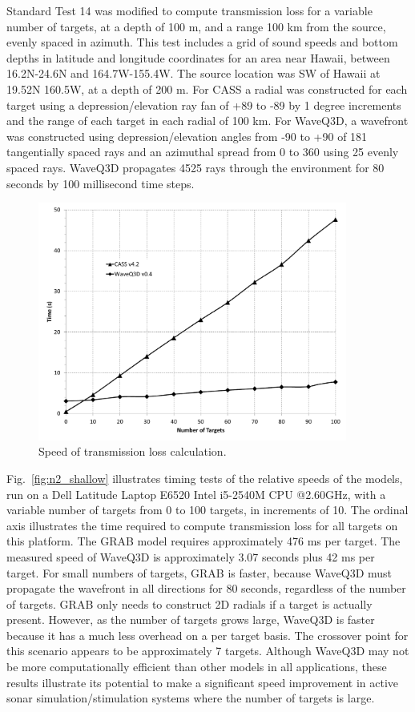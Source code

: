 \documentclass{ws-jca}
\newcommand{\twoD}{2\nobreakdash\textendash D }	%
\begin{document}
Standard Test 14 was modified to compute transmission loss for a variable number of targets, at a depth of 100 m, and a range 100 km from the source, evenly spaced in azimuth. This test includes a grid of sound speeds and bottom depths in latitude and longitude coordinates for an area near Hawaii, between 16.2N-24.6N and 164.7W-155.4W. The source location was SW of Hawaii at 19.52N 160.5W, at a depth of 200 m.  For CASS a radial was constructed for each target using a depression/elevation ray fan of +89 to -89 by 1 degree increments and the range of each target in each radial of 100 km. For WaveQ3D, a wavefront was constructed using depression/elevation angles from -90 to +90 of 181 tangentially spaced rays and an azimuthal spread from 0 to 360 using 25 evenly spaced rays. WaveQ3D propagates 4525 rays through the environment for 80 seconds by 100 millisecond time steps. 

\begin{figure}[th]
	\centerline{\includegraphics[width=4in]{std14_timing_test.pdf}} 
	\vspace*{8pt}
	\caption{Speed of transmission loss calculation. \label{fig:std14_timing_test}}
\end{figure}

Fig.~\ref{fig:n2_shallow} illustrates timing tests of the relative speeds of the models, run on a Dell Latitude Laptop E6520 Intel i5-2540M CPU @2.60GHz, with a variable number of targets from 0 to 100 targets, in increments of 10. The ordinal axis illustrates the time required to compute transmission loss for all targets on this platform.  The GRAB model requires approximately 476 ms per target.  The measured speed of WaveQ3D is approximately 3.07 seconds plus 42 ms per target.  For small numbers of targets, GRAB is faster, because WaveQ3D must propagate the wavefront in all directions for 80 seconds, regardless of the number of targets.  GRAB only needs to construct \twoD radials if a target is actually present.  However, as the number of targets grows large, WaveQ3D is faster because it has a much less overhead on a per target basis.  The crossover point for this scenario appears to be approximately 7 targets.  Although WaveQ3D may not be more computationally efficient than other models in all applications, these results illustrate its potential to make a significant speed improvement in active sonar simulation/stimulation systems where the number of targets is large.
\end{document}

